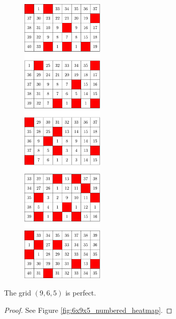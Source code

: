 \begin{figure}[H]
\centering
\includegraphics[width=0.35\textwidth]{figures/7/5x8x5_numbered_heatmap.pdf}
\caption{}
\label{fig:5x8x5_numbered_heatmap}
\end{figure}

\newpage

\begin{con}
\label{con:9x6x5}
The grid $(9,6,5)$ is perfect.
\end{con}

\begin{proof}
See Figure \ref{fig:6x9x5_numbered_heatmap}.
\end{proof}

